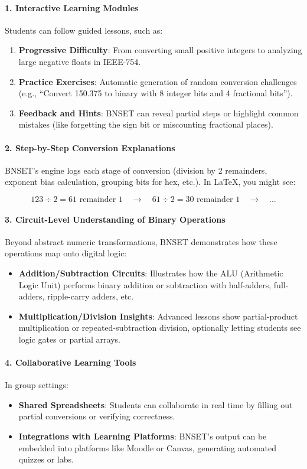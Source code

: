 \documentclass{article}
\begin{document}
\paragraph{1. Interactive Learning Modules}
Students can follow guided lessons, such as:
\begin{enumerate}
  \item \textbf{Progressive Difficulty}: From converting small positive integers to analyzing large negative floats in IEEE-754.
  \item \textbf{Practice Exercises}: Automatic generation of random conversion challenges (e.g., ``Convert 150.375 to binary with 8 integer bits and 4 fractional bits'').
  \item \textbf{Feedback and Hints}: BNSET can reveal partial steps or highlight common mistakes (like forgetting the sign bit or miscounting fractional places).
\end{enumerate}

\paragraph{2. Step-by-Step Conversion Explanations}
BNSET’s engine logs each stage of conversion (division by 2 remainders, exponent bias calculation, grouping bits for hex, etc.). In \LaTeX{}, you might see:

\[
123 \div 2 = 61 \text{ remainder } 1 \quad \rightarrow \quad 61 \div 2 = 30 \text{ remainder } 1 \quad \rightarrow \quad \ldots
\]

\paragraph{3. Circuit-Level Understanding of Binary Operations}
Beyond abstract numeric transformations, BNSET demonstrates how these operations map onto digital logic:
\begin{itemize}
  \item \textbf{Addition/Subtraction Circuits}: Illustrates how the ALU (Arithmetic Logic Unit) performs binary addition or subtraction with half-adders, full-adders, ripple-carry adders, etc.
  \item \textbf{Multiplication/Division Insights}: Advanced lessons show partial-product multiplication or repeated-subtraction division, optionally letting students see logic gates or partial arrays.
\end{itemize}

\paragraph{4. Collaborative Learning Tools}
In group settings:
\begin{itemize}
  \item \textbf{Shared Spreadsheets}: Students can collaborate in real time by filling out partial conversions or verifying correctness.
  \item \textbf{Integrations with Learning Platforms}: BNSET’s output can be embedded into platforms like Moodle or Canvas, generating automated quizzes or labs.
\end{itemize}
\end{document}
